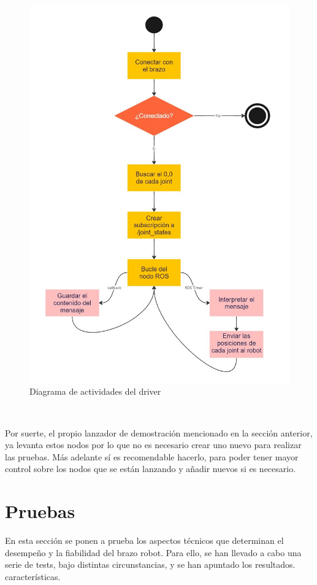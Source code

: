 \begin{figure} [ht!]
    \begin{center}
      \includegraphics[width=12cm]{figs/driver_diagram1.jpg}
    \end{center}
    \caption{Diagrama de actividades del driver}
    \label{fig:dia_driver1}
\end{figure}\ 


Por suerte, el propio lanzador de demostración mencionado en la sección anterior, ya levanta estos nodos por lo que no es necesario crear 
uno nuevo para realizar las pruebas. Más adelante sí es recomendable hacerlo, para poder tener mayor control sobre los nodos 
que se están lanzando y añadir nuevos si es necesario.
\\

\newpage
\section{Pruebas}
\noindent En esta sección se ponen a prueba los aspectos técnicos que determinan el desempeño y la fiabilidad del brazo robot. Para ello, 
se han llevado a cabo una serie de tests, bajo distintas circunstancias, y se han apuntado los resultados.
características.

